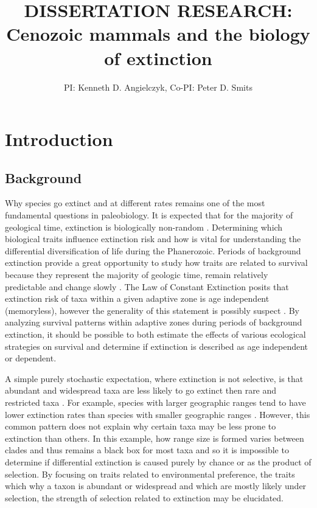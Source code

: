 \documentclass[11pt,letterpaper]{article}
\title{\uppercase{Dissertation Research:}\\ Cenozoic mammals and the biology of extinction}
\author{PI: Kenneth D. Angielczyk, Co-PI: Peter D. Smits}
\date{}
\begin{document}
\setcounter{secnumdepth}{0}

\maketitle

\section{Introduction}
\subsection{Background}
Why species go extinct and at different rates remains one of the most fundamental questions in paleobiology. It is expected that for the majority of geological time, extinction is biologically non-random \citep{Jablonski1986,Alexander1977,Harnik2011,Johnson2002b,Kitchell1986,Nurnberg2013a,Payne2007}. Determining which biological traits influence extinction risk and how is vital for understanding the differential diversification of life during the Phanerozoic. Periods of background extinction provide a great opportunity to study how traits are related to survival because they represent the majority of geologic time, remain relatively predictable and change slowly \citep{Jablonski1986,Raup1988}. The Law of Constant Extinction \citep{VanValen1973} posits that extinction risk of taxa within a given adaptive zone is age independent (memoryless), however the generality of this statement is possibly suspect \citep{Drake2014,Raup1975,Sepkoski1975,Finnegan2008}. By analyzing survival patterns within adaptive zones during periods of background extinction, it should be possible to both estimate the effects of various ecological strategies on survival and determine if extinction is described as age independent or dependent.

A simple purely stochastic expectation, where extinction is not selective, is that abundant and widespread taxa are less likely to go extinct then rare and restricted taxa \citep{Raup1991b}. For example, species with larger geographic ranges tend to have lower extinction rates than species with smaller geographic ranges \citep{Jablonski1986,Harnik2013,Nurnberg2013a,Jablonski2003,Roy2009c}. However, this common pattern does not explain why certain taxa may be less prone to extinction than others. In this example, how range size is formed varies between clades and thus remains a black box for most taxa \citep{Jablonski1987} and so it is impossible to determine if differential extinction is caused purely by chance or as the product of selection. By focusing on traits related to environmental preference, the traits which why a taxon is abundant or widespread and which are mostly likely under selection, the strength of selection related to extinction may be elucidated.
\end{document}
